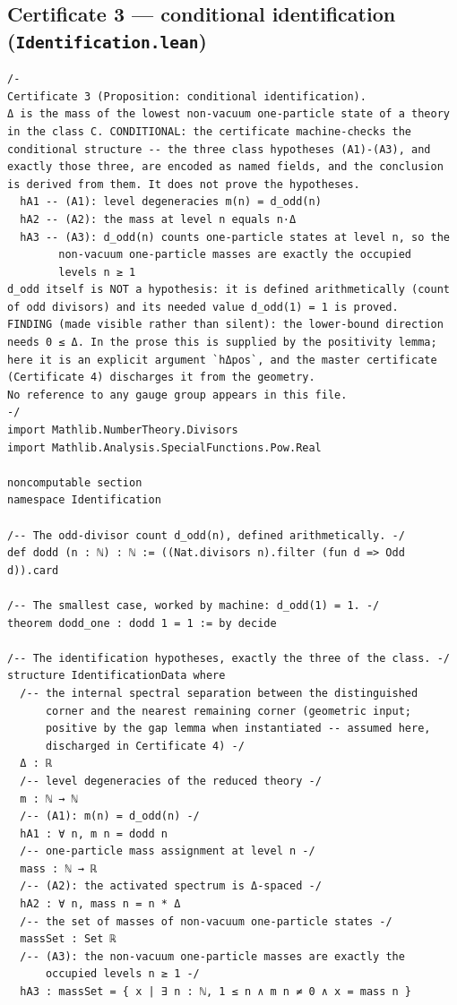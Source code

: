 \documentclass[11pt,a4paper]{article}
\theoremstyle{plain}
\theoremstyle{definition}
\theoremstyle{remark}
\begin{document}
\subsection*{Certificate 3 --- conditional identification (\texttt{Identification.lean})}
\begin{Verbatim}[fontsize=\footnotesize,breaklines=true,breakanywhere=true,formatcom=\leanmono]
/-
Certificate 3 (Proposition: conditional identification).
Δ is the mass of the lowest non-vacuum one-particle state of a theory
in the class C. CONDITIONAL: the certificate machine-checks the
conditional structure -- the three class hypotheses (A1)-(A3), and
exactly those three, are encoded as named fields, and the conclusion
is derived from them. It does not prove the hypotheses.
  hA1 -- (A1): level degeneracies m(n) = d_odd(n)
  hA2 -- (A2): the mass at level n equals n·Δ
  hA3 -- (A3): d_odd(n) counts one-particle states at level n, so the
        non-vacuum one-particle masses are exactly the occupied
        levels n ≥ 1
d_odd itself is NOT a hypothesis: it is defined arithmetically (count
of odd divisors) and its needed value d_odd(1) = 1 is proved.
FINDING (made visible rather than silent): the lower-bound direction
needs 0 ≤ Δ. In the prose this is supplied by the positivity lemma;
here it is an explicit argument `hΔpos`, and the master certificate
(Certificate 4) discharges it from the geometry.
No reference to any gauge group appears in this file.
-/
import Mathlib.NumberTheory.Divisors
import Mathlib.Analysis.SpecialFunctions.Pow.Real

noncomputable section
namespace Identification

/-- The odd-divisor count d_odd(n), defined arithmetically. -/
def dodd (n : ℕ) : ℕ := ((Nat.divisors n).filter (fun d => Odd d)).card

/-- The smallest case, worked by machine: d_odd(1) = 1. -/
theorem dodd_one : dodd 1 = 1 := by decide

/-- The identification hypotheses, exactly the three of the class. -/
structure IdentificationData where
  /-- the internal spectral separation between the distinguished
      corner and the nearest remaining corner (geometric input;
      positive by the gap lemma when instantiated -- assumed here,
      discharged in Certificate 4) -/
  Δ : ℝ
  /-- level degeneracies of the reduced theory -/
  m : ℕ → ℕ
  /-- (A1): m(n) = d_odd(n) -/
  hA1 : ∀ n, m n = dodd n
  /-- one-particle mass assignment at level n -/
  mass : ℕ → ℝ
  /-- (A2): the activated spectrum is Δ-spaced -/
  hA2 : ∀ n, mass n = n * Δ
  /-- the set of masses of non-vacuum one-particle states -/
  massSet : Set ℝ
  /-- (A3): the non-vacuum one-particle masses are exactly the
      occupied levels n ≥ 1 -/
  hA3 : massSet = { x | ∃ n : ℕ, 1 ≤ n ∧ m n ≠ 0 ∧ x = mass n }


\end{Verbatim}
\end{document}
